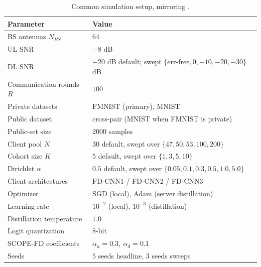 \documentclass[journal]{IEEEtran}
\newcommand{\rev}[1]{#1}
\begin{document}
\begin{table}[t]
\centering
\caption{Common simulation setup, mirroring \cite{mu2024fedtskd}.}
\label{tab:setup}
\renewcommand{\arraystretch}{1.25}
\footnotesize
\setlength{\tabcolsep}{4pt}
\begin{tabular}{@{}>{\raggedright\arraybackslash}m{}>{\raggedright\arraybackslash}m{}@{}}
\toprule
\textbf{Parameter} & \textbf{Value} \\
\midrule
BS antennas $N_{BS}$ & $64$ \\
UL SNR & $-8$ dB \\
DL SNR & $-20$ dB default; swept $\{\text{err-free}, 0, -10, -20, -30\}$ dB \\
Communication rounds $R$ & $100$ \\
Private datasets & FMNIST (primary), MNIST \\
Public dataset & cross-pair (MNIST when FMNIST is private) \\
\rev{Public-set size} & \rev{$2000$ samples} \\
\rev{Client pool $N$} & \rev{$30$ default, swept over $\{47,50,53,100,200\}$} \\
\rev{Cohort size $K$} & \rev{$5$ default, swept over $\{1,3,5,10\}$} \\
Dirichlet $\alpha$ & \rev{$0.5$ default, swept over $\{0.05,0.1,0.3,0.5,1.0,5.0\}$} \\
Client architectures & FD-CNN1 / FD-CNN2 / FD-CNN3 \\
Optimizer & SGD (local), Adam (server distillation) \\
Learning rate & $10^{-2}$ (local), $10^{-3}$ (distillation) \\
Distillation temperature & $1.0$ \\
Logit quantization & $8$-bit \\
SCOPE-FD coefficients & $\alpha_u = 0.3,\ \alpha_d = 0.1$ \\
\rev{Seeds} & \rev{$5$ seeds headline, $3$ seeds sweeps} \\
\bottomrule
\end{tabular}
\end{table}
\end{document}
